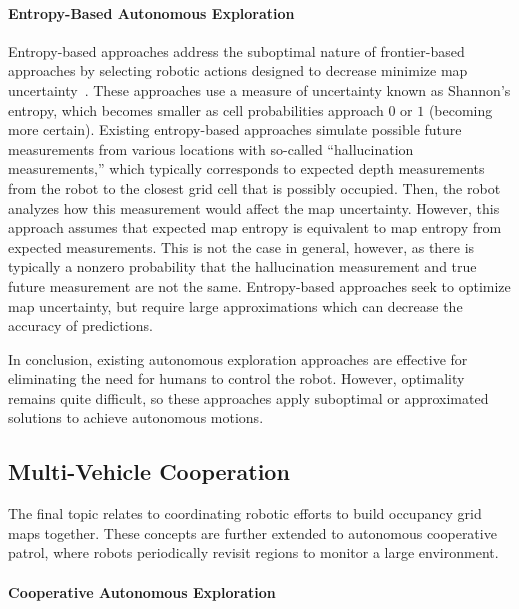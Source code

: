\documentclass[thesis]{thesis-gwu}
\begin{document}
\paragraph{Entropy-Based Autonomous Exploration}
Entropy-based approaches address the suboptimal nature of frontier-based approaches by selecting robotic actions designed to decrease minimize map uncertainty~\cite{StaGriBur05,BurMooStaSch05}. These approaches use a measure of uncertainty known as Shannon's entropy, which becomes smaller as cell probabilities approach $0$ or $1$ (becoming more certain). Existing entropy-based approaches simulate possible future measurements from various locations with so-called ``hallucination measurements,'' which typically corresponds to expected depth measurements from the robot to the closest grid cell that is possibly occupied. Then, the robot analyzes how this measurement would affect the map uncertainty. However, this approach assumes that expected map entropy is equivalent to map entropy from expected measurements. This is not the case in general, however, as there is typically a nonzero probability that the hallucination measurement and true future measurement are not the same. Entropy-based approaches seek to optimize map uncertainty, but require large approximations which can decrease the accuracy of predictions.

In conclusion, existing autonomous exploration approaches are effective for eliminating the need for humans to control the robot. However, optimality remains quite difficult, so these approaches apply suboptimal or approximated solutions to achieve autonomous motions.


\subsection{Multi-Vehicle Cooperation}

The final topic relates to coordinating robotic efforts to build occupancy grid maps together. These concepts are further extended to autonomous cooperative patrol, where robots periodically revisit regions to monitor a large environment.

\paragraph{Cooperative Autonomous Exploration}
\end{document}
